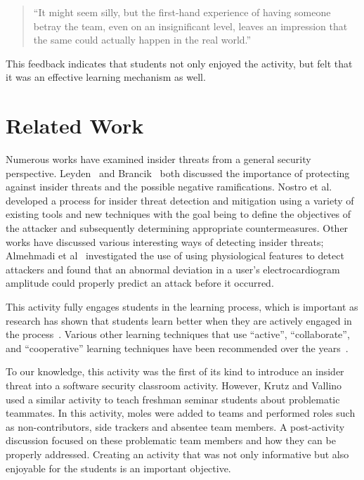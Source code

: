 \documentclass[conference]{IEEEtran}
\begin{document}
\begin{quotation}
``It might seem silly, but the first-hand experience of having someone betray the team, even on an insignificant level, leaves an impression that the same could actually happen in the real world.''
\end{quotation}

This feedback indicates that students not only enjoyed the activity, but felt that it was an effective learning mechanism as well.

\section{Related Work}
\label{sec: relatedwork}

Numerous works have examined insider threats from a general security perspective. Leyden~\cite{Leyden_URL} and Brancik~\cite{Brancik_url} both discussed the importance of protecting against insider threats and the possible negative ramifications. Nostro et al.~\cite{Nostro:2014:ITA:2694737.2694740} developed a process for insider threat detection and mitigation using a variety of existing tools and new techniques with the goal being to define the objectives of the attacker and subsequently determining appropriate countermeasures. Other works have discussed various interesting ways of detecting insider threats; Almehmadi et al~\cite{Almehmadi:2014:PIT:2659651.2659654} investigated the use of using physiological features to detect attackers and found that an abnormal deviation in a user's electrocardiogram amplitude could properly predict an attack before it occurred.

This activity fully engages students in the learning process, which is important as research has shown that students learn better when they are actively engaged in the process~\cite{19897}. Various other learning techniques that use ``active'', ``collaborate'', and ``cooperative'' learning techniques have been recommended over the years~\cite{bonwell1991active, Schweitzer:2007:IVA:1227310.1227384, Bailey:2005:JTC:1047124.1047469, sutherland1996using}.

To our knowledge, this activity was the first of its kind to introduce an insider threat into a software security classroom activity. However, Krutz and Vallino~\cite{6685085} used a similar activity to teach freshman seminar students about problematic teammates. In this activity, moles were added to teams and performed roles such as non-contributors, side trackers and absentee team members. A post-activity discussion focused on these problematic team members and how they can be properly addressed. Creating an activity that was not only informative but also enjoyable for the students is an important objective.
\end{document}
